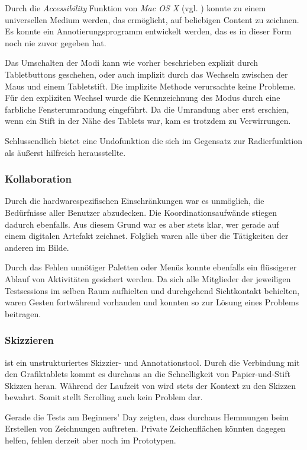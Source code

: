 Durch die \emph{Accessibility} Funktion von \emph{Mac OS X} (vgl. ) konnte \scribbler zu einem universellen Medium werden, das ermöglicht, auf beliebigen Content zu zeichnen. Es konnte ein Annotierungsprogramm entwickelt werden, das es in dieser Form noch nie zuvor gegeben hat. 

Das Umschalten der Modi kann wie vorher beschrieben explizit durch Tabletbuttons geschehen, oder auch implizit durch das Wechseln zwischen der Maus und einem Tabletstift. Die implizite Methode verursachte keine Probleme. Für den expliziten Wechsel wurde die Kennzeichnung des Modus durch eine farbliche Fensterumrandung eingeführt. Da die Umrandung aber erst erschien, wenn ein Stift in der Nähe des Tablets war, kam es trotzdem zu Verwirrungen. 

Schlussendlich bietet \scribbler eine Undofunktion die sich im Gegensatz zur Radierfunktion als äußerst hilfreich herausstellte.

\subsubsection*{Kollaboration} 
Durch die hardwarespezifischen Einschränkungen war es unmöglich, die Bedürfnisse aller Benutzer abzudecken. Die Koordinationsaufwände stiegen dadurch ebenfalls. Aus diesem Grund war es aber stets klar, wer gerade auf einem digitalen Artefakt zeichnet. Folglich waren alle über die Tätigkeiten der anderen im Bilde.

Durch das Fehlen unnötiger Paletten oder Menüs konnte ebenfalls ein flüssigerer Ablauf von Aktivitäten gesichert werden. Da sich alle Mitglieder der jeweiligen Testsessions im selben Raum aufhielten und durchgehend Sichtkontakt behielten, waren Gesten fortwährend vorhanden und konnten so zur Lösung eines Problems beitragen.

\subsubsection*{Skizzieren} 
\scribbler ist ein unstrukturiertes Skizzier- und Annotationstool. Durch die Verbindung mit den Grafiktablets kommt es durchaus an die Schnelligkeit von Papier-und-Stift Skizzen heran. Während der Laufzeit von \scribbler wird stets der Kontext zu den Skizzen bewahrt. Somit stellt Scrolling auch kein Problem dar. 

Gerade die Tests am Beginners' Day zeigten, dass durchaus Hemmungen beim Erstellen von Zeichnungen auftreten. Private Zeichenflächen könnten dagegen helfen, fehlen derzeit aber noch im Prototypen.

